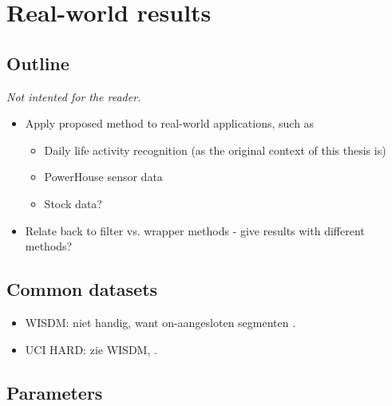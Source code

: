 
\chapter{Real-world results}

\label{Chapter6} %


\section{Outline}
\emph{Not intented for the reader.}
\begin{itemize}
  \item Apply proposed method to real-world applications, such as
    \begin{itemize}
      \item Daily life activity recognition (as the original context of this thesis is)
      \item PowerHouse sensor data
      \item Stock data?
    \end{itemize}
  \item Relate back to filter vs. wrapper methods - give results with different methods?
\end{itemize}

\section{Common datasets}
\begin{itemize}
  \item WISDM: niet handig, want on-aangesloten segmenten \cite{kwapisz2011activity}.
  \item UCI HARD: zie WISDM, \cite{anguita2012human}.
\end{itemize}



\section{Parameters}
